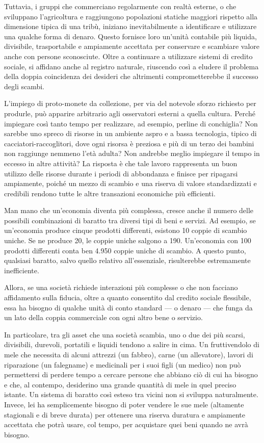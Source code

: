 \documentclass[
  a5paper,
  smalldemyvopaper,10pt,twoside,onecolumn,openright,extrafontsizes,hidelinks]{memoir}
\begin{document}
Tuttavia, i gruppi che commerciano regolarmente con realtà esterne, o
che sviluppano l'agricoltura e raggiungono popolazioni statiche maggiori
rispetto alla dimensione tipica di una tribù, iniziano inevitabilmente a
identificare e utilizzare una qualche forma di denaro. Questo fornisce
loro un'unità contabile più liquida, divisibile, trasportabile e
ampiamente accettata per conservare e scambiare valore anche con persone
sconosciute. Oltre a continuare a utilizzare sistemi di credito sociale,
si affidano anche al registro naturale, riuscendo così a eludere il
problema della doppia coincidenza dei desideri che altrimenti
comprometterebbe il successo degli scambi.

L'impiego di proto-monete da collezione, per via del notevole sforzo
richiesto per produrle, può apparire arbitrario agli osservatori esterni
a quella cultura. Perché impiegare così tanto tempo per realizzare, ad
esempio, perline di conchiglia? Non sarebbe uno spreco di risorse in un
ambiente aspro e a bassa tecnologia, tipico di cacciatori-raccoglitori,
dove ogni risorsa è preziosa e più di un terzo dei bambini non raggiunge
nemmeno l'età adulta? Non andrebbe meglio impiegare il tempo in eccesso
in altre attività? La risposta è che tale lavoro rappresenta un buon
utilizzo delle risorse durante i periodi di abbondanza e finisce per
ripagarsi ampiamente, poiché un mezzo di scambio e una riserva di valore
standardizzati e credibili rendono tutte le altre transazioni economiche
più efficienti.

Man mano che un'economia diventa più complessa, cresce anche il numero
delle possibili combinazioni di baratto tra diversi tipi di beni e
servizi. Ad esempio, se un'economia produce cinque prodotti differenti,
esistono 10 coppie di scambio uniche. Se ne produce 20, le coppie uniche
salgono a 190. Un'economia con 100 prodotti differenti conta ben 4.950
coppie uniche di scambio. A questo punto, qualsiasi baratto, salvo
quello relativo all'essenziale, risulterebbe estremamente inefficiente.

Allora, se una società richiede interazioni più complesse o che non
facciano affidamento sulla fiducia, oltre a quanto consentito dal
credito sociale flessibile, essa ha bisogno di qualche unità di conto
standard --- o denaro --- che funga da un lato della coppia commerciale
con ogni altro bene o servizio.

In particolare, tra gli asset che una società scambia, uno o due dei più
scarsi, divisibili, durevoli, portatili e liquidi tendono a salire in
cima. Un fruttivendolo di mele che necessita di alcuni attrezzi (un
fabbro), carne (un allevatore), lavori di riparazione (un falegname) e
medicinali per i suoi figli (un medico) non può permettersi di perdere
tempo a cercare persone che abbiano ciò di cui ha bisogno e che, al
contempo, desiderino una grande quantità di mele in quel preciso
istante. Un sistema di baratto così esteso tra vicini non si sviluppa
naturalmente. Invece, lei ha semplicemente bisogno di poter vendere le
sue mele (altamente stagionali e di breve durata) per ottenere una
riserva duratura e ampiamente accettata che potrà usare, col tempo, per
acquistare quei beni quando ne avrà bisogno.
\end{document}
